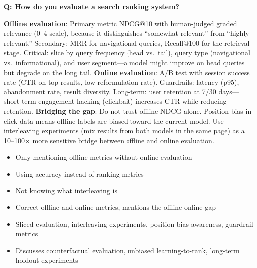 \begin{interviewq}
\end{interviewq}

\begin{interviewq}
\textbf{Q: How do you evaluate a search ranking system?}

 \quad {} \quad \badgefreq{\freqhigh}

\stronganswer \textbf{Offline evaluation}: Primary metric NDCG@10 with human-judged graded relevance (0--4 scale), because it distinguishes ``somewhat relevant'' from ``highly relevant.'' Secondary: MRR for navigational queries, Recall@100 for the retrieval stage. Critical: slice by query frequency (head vs.\ tail), query type (navigational vs.\ informational), and user segment---a model might improve on head queries but degrade on the long tail. \textbf{Online evaluation}: A/B test with session success rate (CTR on top results, low reformulation rate). Guardrails: latency (p95), abandonment rate, result diversity. Long-term: user retention at 7/30 days---short-term engagement hacking (clickbait) increases CTR while reducing retention. \textbf{Bridging the gap}: Do not trust offline NDCG alone. Position bias in click data means offline labels are biased toward the current model. Use interleaving experiments (mix results from both models in the same page) as a 10--100$\times$ more sensitive bridge between offline and online evaluation.

\redflags
\begin{itemize}
    \item Only mentioning offline metrics without online evaluation
    \item Using accuracy instead of ranking metrics
    \item Not knowing what interleaving is
\end{itemize}


\goodgreat
\begin{itemize}
    \item {} Correct offline and online metrics, mentions the offline-online gap
    \item {} Sliced evaluation, interleaving experiments, position bias awareness, guardrail metrics
    \item {} Discusses counterfactual evaluation, unbiased learning-to-rank, long-term holdout experiments
\end{itemize}

\end{interviewq}

